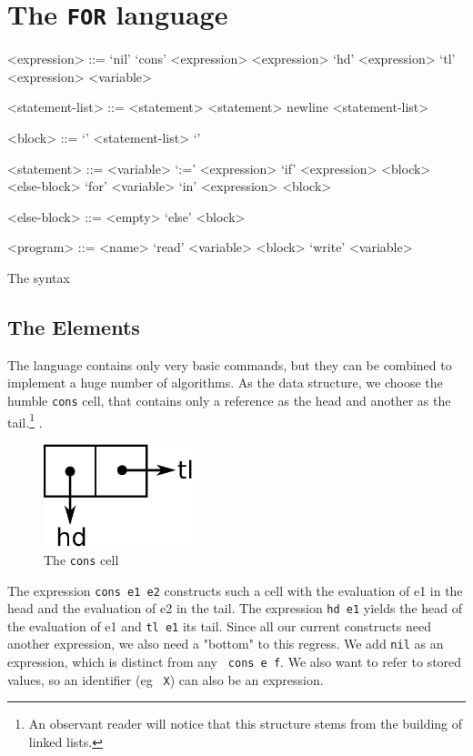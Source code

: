 \section{The {\tt FOR} language}
\label{sec:FOR}
\begin{table}[htb]
	\begin{grammar}
		<expression> ::= 
							`nil' 
				\alt 	`cons' <expression> <expression>
				\alt 	`hd' <expression>
				\alt 	`tl' <expression>
				\alt 	<variable>

		<statement-list> ::= <statement> \alt <statement> newline <statement-list>

		<block> ::= `{' <statement-list> `}'

		<statement> ::=
							<variable> `:=' <expression>
				\alt	`if' <expression> <block> <else-block>
				\alt	`for' <variable> `in' <expression> <block>
			
				<else-block> ::= <empty> \alt `else' <block>
				
				<program> ::= <name> `read' <variable> <block> `write' <variable>
	\end{grammar}
	\caption{The \FOR syntax \label{tab:FOR-syntax}}
\end{table}

\subsection{The Elements} %
\label{sub:The Elements}
The \FOR language contains only very basic commands, but they can be combined
to implement a huge number of algorithms. As the data structure, we choose 
the humble {\tt cons} cell, that contains only a reference as the head and 
another as the tail.\footnote{An observant reader will notice that this
structure stems from the building of linked lists.}
.
\begin{figure}[htb]
	\begin{center}
		\includegraphics[height=3cm]{for/images/conscell}
	\end{center}
	\caption{The {\tt cons} cell}
\end{figure}

The expression {\tt cons e1 e2} constructs such a cell with the evaluation of
e1 in the head and the evaluation of e2 in the tail. The expression {\tt hd e1}
yields the head of the evaluation of e1 and {\tt tl e1} its tail. Since all our
current constructs need another expression, we also need a "bottom" to this
regress. We add {\tt nil} as an expression, which is distinct from any {\tt
cons e f}. We also want to refer to stored values, so an identifier (eg {\tt
X}) can also be an expression.

